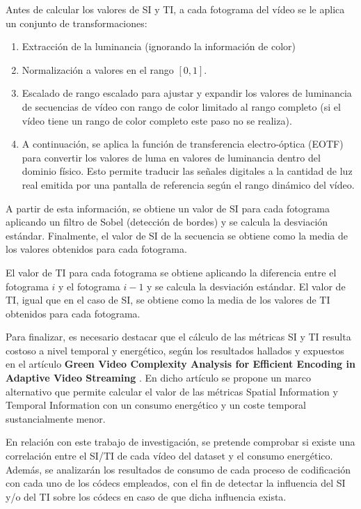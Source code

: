  Antes de calcular los valores de SI y TI, a cada fotograma del vídeo se le aplica un conjunto de transformaciones:
 \begin{enumerate}
   \item Extracción de la luminancia (ignorando la información de color)
   \item Normalización a valores en el rango \([0,1]\).
   \item Escalado de rango escalado para ajustar y expandir los valores de luminancia de secuencias de vídeo con rango de color limitado al rango completo (si el vídeo tiene un rango de color completo este paso no se realiza).
   \item A continuación, se aplica la función de transferencia electro-óptica (EOTF) para convertir los valores de luma en valores de luminancia dentro del dominio físico. Esto permite traducir las señales digitales a la cantidad de luz real emitida por una pantalla de referencia según el rango dinámico del vídeo.
 \end{enumerate}
 
 A partir de esta información, se obtiene un valor de SI para cada fotograma aplicando un filtro de Sobel (detección de bordes) y se calcula la desviación estándar. Finalmente, el valor de SI de la secuencia se obtiene como la media de los valores obtenidos para cada fotograma.
 
 El valor de TI para cada fotograma se obtiene aplicando la diferencia entre el fotograma $i$ y el fotograma $i-1$ y se calcula la desviación estándar. El valor de TI, igual que en el caso de SI, se obtiene como la media de los valores de TI obtenidos para cada fotograma.

 Para finalizar, es necesario destacar que el cálculo de las métricas SI y TI resulta costoso a nivel temporal y energético, según los resultados hallados y expuestos en el artículo \textbf{Green Video Complexity Analysis for Efficient Encoding in Adaptive Video Streaming} \cite{video-complexity}. En dicho artículo se propone un marco alternativo que permite calcular el valor de las métricas Spatial Information y Temporal Information con un consumo energético y un coste temporal sustancialmente menor.

 En relación con este trabajo de investigación, se pretende comprobar si existe una correlación entre el SI/TI de cada vídeo del dataset y el consumo energético. Además, se analizarán los resultados de consumo de cada proceso de codificación con cada uno de los códecs empleados, con el fin de detectar la influencia del SI y/o del TI sobre los códecs en caso de que dicha influencia exista.
